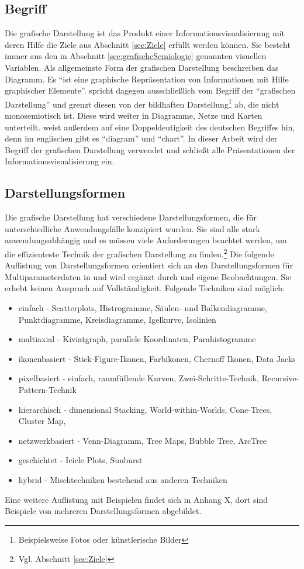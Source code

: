 \documentclass[a4paper, 12pt, DIVcalc, onepage, pdftex, headsepline, footsepline]{scrreprt}
\begin{document}
\subsection{Begriff}
Die grafische Darstellung ist das Produkt einer Informationsvisualisierung mit deren Hilfe
die Ziele aus Abschnitt \ref{sec:Ziele} erfüllt werden können. Sie besteht
immer aus den in Abschnitt \ref{sec:grafischeSemiologie} genannten
visuellen Variablen.
Als allgemeinste Form der grafischen Darstellung beschreiben \citep{Schumann} das
Diagramm. Es "`ist eine graphische Repräsentation von Informationen mit Hilfe
graphischer Elemente"'\citep[S.\,126]{Schumann}. \citep{Bertin} spricht dagegen
ausschließlich vom Begriff der "`grafischen Darstellung"' und grenzt diesen von
der bildhaften Darstellung\footnote{Beispielsweise Fotos oder künstlerische Bilder}
ab, die nicht monosemiotisch ist. Diese wird weiter in Diagramme, Netze
und Karten unterteilt. \citep{Schumann} weist außerdem auf eine Doppeldeutigkeit
des deutschen Begriffes hin, denn im englischen gibt es "`diagram"' und "`chart"'.
In dieser Arbeit wird der Begriff
der grafischen Darstellung verwendet und schließt alle Präsentationen der
Informationsvisualisierung ein.

\subsection{Darstellungsformen}
\label{sec:Darstellungsformen}
Die grafische Darstellung hat verschiedene Darstellungsformen, die für unterschiedliche
Anwendungsfälle konzipiert wurden. Sie sind alle stark anwendungsabhängig und es müssen viele
Anforderungen beachtet werden, um die effizienteste Technik der grafischen Darstellung zu
finden.\footnote{Vgl. Abschnitt \ref{sec:Ziele}}
Die folgende Auflistung von Darstellungsformen orientiert sich an den Darstellungsformen für
Multiparameterdaten in \citep[S.\,213]{Schumann} und
wird ergänzt durch \citep{Preim} und eigene Beobachtungen. Sie erhebt keinen Anspruch auf
Vollständigkeit. Folgende Techniken sind möglich:
\begin{itemize}
\item einfach - Scatterplots, Histrogramme, Säulen- und Balkendiagramme, Punktdiagramme, Kreisdiagramme, Igelkurve, Isolinien
\item multiaxial - Kiviatgraph, parallele Koordinaten, Parahistogramme
\item ikonenbasiert - Stick-Figure-Ikonen, Farbikonen, Chernoff Ikonen, Data Jacks
\item pixelbasiert - einfach, raumfüllende Kurven, Zwei-Schritte-Technik, Recursive-Pattern-Technik
\item hierarchisch - dimensional Stacking, World-within-Worlds, Cone-Trees, Cluster Map, 
\item netzwerkbasiert - Venn-Diagramm, Tree Maps, Bubble Tree, ArcTree
\item geschichtet - Icicle Plots, Sunburst
\item hybrid - Mischtechniken bestehend aus anderen Techniken
\end{itemize}
Eine weitere Auflistung mit Beispielen findet sich in Anhang X, dort sind Beispiele
von mehreren Darstellungsformen abgebildet.
\end{document}

